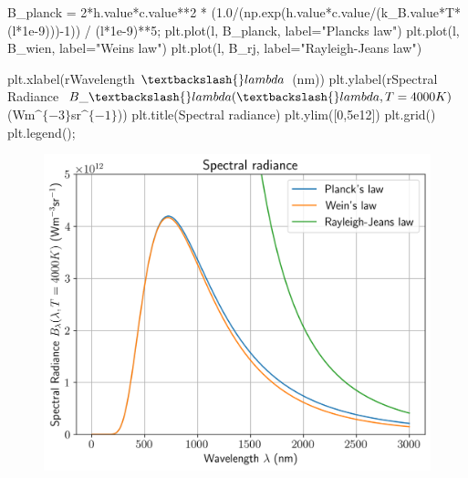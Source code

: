 \documentclass[
  letterpaper,
  DIV=11,
  numbers=noendperiod]{scrartcl}
\newenvironment{Shaded}{\begin{snugshade}}{\end{snugshade}}
\newcommand{\DecValTok}[1]{\textcolor[rgb]{0.68,0.00,0.00}{#1}}
\newcommand{\FloatTok}[1]{\textcolor[rgb]{0.68,0.00,0.00}{#1}}
\newcommand{\NormalTok}[1]{\textcolor[rgb]{0.00,0.23,0.31}{#1}}
\newcommand{\OperatorTok}[1]{\textcolor[rgb]{0.37,0.37,0.37}{#1}}
\newcommand{\StringTok}[1]{\textcolor[rgb]{0.13,0.47,0.30}{#1}}
\newcommand{\VerbatimStringTok}[1]{\textcolor[rgb]{0.13,0.47,0.30}{#1}}
\begin{document}
\begin{Shaded}
\begin{Highlighting}[]
\NormalTok{B\_planck }\OperatorTok{=} \DecValTok{2}\OperatorTok{*}\NormalTok{h.value}\OperatorTok{*}\NormalTok{c.value}\OperatorTok{**}\DecValTok{2} \OperatorTok{*}\NormalTok{ (}\FloatTok{1.0}\OperatorTok{/}\NormalTok{(np.exp(h.value}\OperatorTok{*}\NormalTok{c.value}\OperatorTok{/}\NormalTok{(k\_B.value}\OperatorTok{*}\NormalTok{T}\OperatorTok{*}\NormalTok{(l}\OperatorTok{*}\FloatTok{1e{-}9}\NormalTok{)))}\OperatorTok{{-}}\DecValTok{1}\NormalTok{)) }\OperatorTok{/}\NormalTok{ (l}\OperatorTok{*}\FloatTok{1e{-}9}\NormalTok{)}\OperatorTok{**}\DecValTok{5}\OperatorTok{;}
\NormalTok{plt.plot(l, B\_planck, label}\OperatorTok{=}\StringTok{"Planck\textquotesingle{}s law"}\NormalTok{)}
\NormalTok{plt.plot(l, B\_wien, label}\OperatorTok{=}\StringTok{"Wein\textquotesingle{}s law"}\NormalTok{)}
\NormalTok{plt.plot(l, B\_rj, label}\OperatorTok{=}\StringTok{"Rayleigh{-}Jeans law"}\NormalTok{)}

\NormalTok{plt.xlabel(}\VerbatimStringTok{r\textquotesingle{}Wavelength $\textbackslash{}lambda$ (nm)\textquotesingle{}}\NormalTok{)}
\NormalTok{plt.ylabel(}\VerbatimStringTok{r\textquotesingle{}Spectral Radiance $B\_\textbackslash{}lambda(\textbackslash{}lambda, T=4000K)$ (Wm$\^{}\{{-}3\}$sr$\^{}\{{-}1\}$)\textquotesingle{}}\NormalTok{)}
\NormalTok{plt.title(}\StringTok{\textquotesingle{}Spectral radiance\textquotesingle{}}\NormalTok{)}
\NormalTok{plt.ylim([}\DecValTok{0}\NormalTok{,}\FloatTok{5e12}\NormalTok{])}
\NormalTok{plt.grid()}
\NormalTok{plt.legend()}\OperatorTok{;}
\end{Highlighting}
\end{Shaded}

\begin{figure}[H]

{\centering \includegraphics{SP1.1_-_Stellar_Properties_files/figure-pdf/cell-21-output-1.png}

}

\end{figure}
\end{document}
